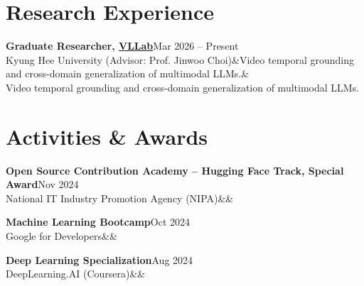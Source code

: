 \documentclass[11pt]{article}
\newcommand{\entry}[4]{%
  \textbf{#1}\hfill{\color{muted}#2}\\
  #3\ifx&#4&\else\\{\small\color{muted}#4}\fi\par\vspace{6pt}}
\begin{document}
\section*{Research Experience}
\entry{Graduate Researcher, \href{https://vll.khu.ac.kr}{VLLab}}{Mar 2026 -- Present}
  {Kyung Hee University (Advisor: Prof. Jinwoo Choi)}
  {Video temporal grounding and cross-domain generalization of multimodal LLMs.}

\section*{Activities \& Awards}
\entry{Open Source Contribution Academy -- Hugging Face Track, Special Award}{Nov 2024}
  {National IT Industry Promotion Agency (NIPA)}{}
\entry{Machine Learning Bootcamp}{Oct 2024}
  {Google for Developers}{}
\entry{Deep Learning Specialization}{Aug 2024}
  {DeepLearning.AI (Coursera)}{}

\end{document}
